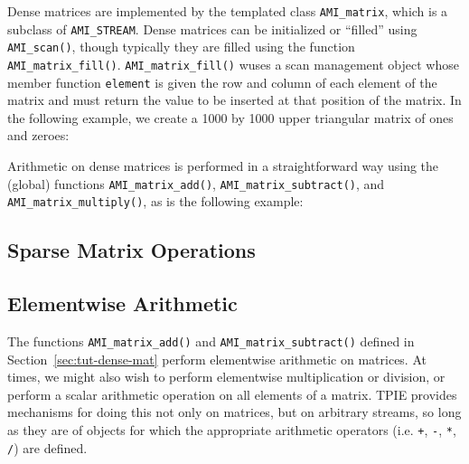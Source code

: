 Dense matrices are implemented by the templated class
\lstinline|AMI_matrix|,
which is a subclass of
\lstinline|AMI_STREAM|.
Dense matrices can be initialized or ``filled'' using
\lstinline|AMI_scan()|, though typically they are filled using
the function \lstinline|AMI_matrix_fill()|.
\lstinline|AMI_matrix_fill()| wuses a scan management object
whose member function \lstinline|element| is given the row and
column of each element of the matrix and must return the
value to be inserted at that position of the matrix. In the
following example, we create a 1000 by 1000 upper triangular
matrix of ones and zeroes:



Arithmetic on dense matrices is performed in a straightforward way
using the (global) functions \lstinline|AMI_matrix_add()|,
\lstinline|AMI_matrix_subtract()|, and
\lstinline|AMI_matrix_multiply()|, as is the following example:




\subsection{Sparse Matrix Operations}


\tobewritten


\subsection{Elementwise Arithmetic}

 The functions
\lstinline|AMI_matrix_add()| and \lstinline|AMI_matrix_subtract()|
defined in Section~\ref{sec:tut-dense-mat} perform elementwise
arithmetic on matrices.  At times, we might also wish to perform
elementwise multiplication or division, or perform a scalar arithmetic
operation on all elements of a matrix.  TPIE provides mechanisms for
doing this not only on matrices, but on arbitrary streams, so long as
they are of objects for which the appropriate arithmetic operators
(i.e. \lstinline|+|, \lstinline|-|, \lstinline|*|, \lstinline|/|) are
defined.

